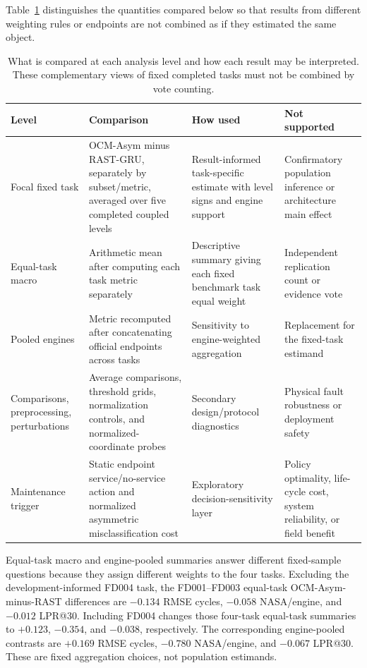 \documentclass[preprint,12pt,numbers,sort&compress]{elsarticle}
\begin{document}
Table~\ref{tab:estimands} distinguishes the quantities compared below so that results from different weighting rules or endpoints are not combined as if they estimated the same object.

\begin{table}[!t]
\centering
\small
\caption{What is compared at each analysis level and how each result may be interpreted. These complementary views of fixed completed tasks must not be combined by vote counting.}
\label{tab:estimands}
\begin{tabular}{@{}p{}p{}p{}p{}@{}}
\toprule
Level & Comparison & How used & Not supported \\
\midrule
Focal fixed task & OCM-Asym minus RAST-GRU, separately by subset/metric, averaged over five completed coupled levels & Result-informed task-specific estimate with level signs and engine support & Confirmatory population inference or architecture main effect \\
Equal-task macro & Arithmetic mean after computing each task metric separately & Descriptive summary giving each fixed benchmark task equal weight & Independent replication count or evidence vote \\
Pooled engines & Metric recomputed after concatenating official endpoints across tasks & Sensitivity to engine-weighted aggregation & Replacement for the fixed-task estimand \\
Comparisons, preprocessing, perturbations & Average comparisons, threshold grids, normalization controls, and normalized-coordinate probes & Secondary design/protocol diagnostics & Physical fault robustness or deployment safety \\
Maintenance trigger & Static endpoint service/no-service action and normalized asymmetric misclassification cost & Exploratory decision-sensitivity layer & Policy optimality, life-cycle cost, system reliability, or field benefit \\
\bottomrule
\end{tabular}
\end{table}
\FloatBarrier

Equal-task macro and engine-pooled summaries answer different fixed-sample questions because they assign different weights to the four tasks. Excluding the development-informed FD004 task, the FD001--FD003 equal-task OCM-Asym-minus-RAST differences are $-0.134$ RMSE cycles, $-0.058$ NASA/engine, and $-0.012$ LPR@30. Including FD004 changes those four-task equal-task summaries to $+0.123$, $-0.354$, and $-0.038$, respectively. The corresponding engine-pooled contrasts are $+0.169$ RMSE cycles, $-0.780$ NASA/engine, and $-0.067$ LPR@30. These are fixed aggregation choices, not population estimands.
\end{document}
